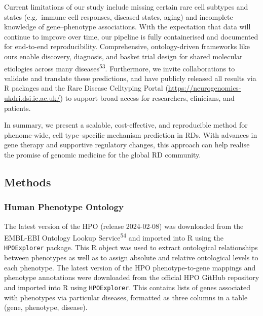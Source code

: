 \documentclass[
]{article}
\begin{document}
Current limitations of our study include missing certain rare cell
subtypes and states (e.g.~immune cell responses, diseased states, aging)
and incomplete knowledge of gene--phenotype associations. With the
expectation that data will continue to improve over time, our pipeline
is fully containerised and documented for end-to-end reproducibility.
Comprehensive, ontology-driven frameworks like ours enable discovery,
diagnosis, and basket trial design for shared molecular etiologies
across many diseases\textsuperscript{53}. Furthermore, we invite
collaborations to validate and translate these predictions, and have
publicly released all results via R packages and the Rare Disease
Celltyping Portal (\url{https://neurogenomics-ukdri.dsi.ic.ac.uk/}) to
support broad access for researchers, clinicians, and patients.

In summary, we present a scalable, cost-effective, and reproducible
method for phenome-wide, cell type--specific mechanism prediction in
RDs. With advances in gene therapy and supportive regulatory changes,
this approach can help realise the promise of genomic medicine for the
global RD community.

\subsection{Methods}\label{sec-methods}

\subsubsection{Human Phenotype Ontology}\label{human-phenotype-ontology}

The latest version of the HPO (release 2024-02-08) was downloaded from
the EMBL-EBI Ontology Lookup Service\textsuperscript{54} and imported
into R using the \texttt{HPOExplorer} package. This R object was used to
extract ontological relationships between phenotypes as well as to
assign absolute and relative ontological levels to each phenotype. The
latest version of the HPO phenotype-to-gene mappings and phenotype
annotations were downloaded from the official HPO GitHub repository and
imported into R using \texttt{HPOExplorer}. This contains lists of genes
associated with phenotypes via particular diseases, formatted as three
columns in a table (gene, phenotype, disease).
\end{document}
